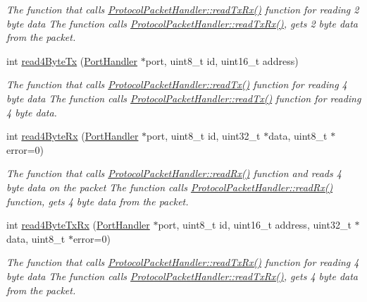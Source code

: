 \begin{DoxyCompactItemize}
\begin{DoxyCompactList}\small\item\em The function that calls \hyperlink{classmercury_1_1_protocol_packet_handler_a368325ca9c0c783b1e88ef32a4544e51}{Protocol\+Packet\+Handler\+::read\+Tx\+Rx()} function for reading 2 byte data  The function calls \hyperlink{classmercury_1_1_protocol_packet_handler_a368325ca9c0c783b1e88ef32a4544e51}{Protocol\+Packet\+Handler\+::read\+Tx\+Rx()},  gets 2 byte data from the packet. \end{DoxyCompactList}\item 
int \hyperlink{classmercury_1_1_protocol_packet_handler_a54aca6764cfb0cfcc6069557645f18a7}{read4\+Byte\+Tx} (\hyperlink{classmercury_1_1_port_handler}{Port\+Handler} $\ast$port, uint8\+\_\+t id, uint16\+\_\+t address)
\begin{DoxyCompactList}\small\item\em The function that calls \hyperlink{classmercury_1_1_protocol_packet_handler_aebb2c28d6b3f2e87c7a56b757a24810b}{Protocol\+Packet\+Handler\+::read\+Tx()} function for reading 4 byte data  The function calls \hyperlink{classmercury_1_1_protocol_packet_handler_aebb2c28d6b3f2e87c7a56b757a24810b}{Protocol\+Packet\+Handler\+::read\+Tx()} function for reading 4 byte data. \end{DoxyCompactList}\item 
int \hyperlink{classmercury_1_1_protocol_packet_handler_ae130d40309fcbc0302274a13fd40830b}{read4\+Byte\+Rx} (\hyperlink{classmercury_1_1_port_handler}{Port\+Handler} $\ast$port, uint8\+\_\+t id, uint32\+\_\+t $\ast$data, uint8\+\_\+t $\ast$error=0)
\begin{DoxyCompactList}\small\item\em The function that calls \hyperlink{classmercury_1_1_protocol_packet_handler_af7ff32d0eca6395b92bf7efc02118a27}{Protocol\+Packet\+Handler\+::read\+Rx()} function and reads 4 byte data on the packet  The function calls \hyperlink{classmercury_1_1_protocol_packet_handler_af7ff32d0eca6395b92bf7efc02118a27}{Protocol\+Packet\+Handler\+::read\+Rx()} function,  gets 4 byte data from the packet. \end{DoxyCompactList}\item 
int \hyperlink{classmercury_1_1_protocol_packet_handler_ac8d351474e574501137c3ac02fe64fdc}{read4\+Byte\+Tx\+Rx} (\hyperlink{classmercury_1_1_port_handler}{Port\+Handler} $\ast$port, uint8\+\_\+t id, uint16\+\_\+t address, uint32\+\_\+t $\ast$data, uint8\+\_\+t $\ast$error=0)
\begin{DoxyCompactList}\small\item\em The function that calls \hyperlink{classmercury_1_1_protocol_packet_handler_a368325ca9c0c783b1e88ef32a4544e51}{Protocol\+Packet\+Handler\+::read\+Tx\+Rx()} function for reading 4 byte data  The function calls \hyperlink{classmercury_1_1_protocol_packet_handler_a368325ca9c0c783b1e88ef32a4544e51}{Protocol\+Packet\+Handler\+::read\+Tx\+Rx()},  gets 4 byte data from the packet. \end{DoxyCompactList}\item 

\end{DoxyCompactItemize}

